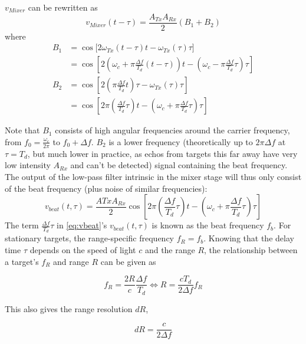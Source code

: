 \(v_{Mixer}\) can be rewritten as 
\begin{equation*}
	v_{Mixer}(t-\tau) = \frac{A_{Tx} A_{Rx}}{2}(B_1 + B_2)
\end{equation*}
where
\begin{align*}
	B_1 &= \cos\bigl[ 2\omega_{Tx}(t-\tau) t - \omega_{Tx}(\tau)\tau \bigr]\\
        &= \cos\left[ 2\left(\omega_c + \pi\frac{\Delta f}{T_d}(t-\tau)\right)t - \left(\omega_c - \pi\frac{\Delta f}{T_d}\tau\right)\tau \right]\\
    B_2 &= \cos\left[ 2\left(\pi\frac{\Delta f}{T_d}t\right)\tau - \omega_{Tx}(\tau)\tau \right]\\
        &= \cos\left[ 2\pi\left(\frac{\Delta f}{T_d}\tau\right)t - \left(\omega_c + \pi\frac{\Delta f}{T_d}\tau\right)\tau \right]
\end{align*}

Note that \(B_1\) consists of high angular frequencies around the
carrier frequency, from \(f_0 = \frac{\omega_c}{2\pi}\) to
\(f_0 + \Delta f\). \(B_2\) is a lower frequency (theoretically up to
\(2\pi\Delta f\) at \(\tau = T_d\), but much lower in practice, as echos
from targets this far away have very low intensity \(A_{Rx}\) and can't
be detected) signal containing the beat frequency. The output of the
low-pass filter intrinsic in the mixer stage will thus only consist of
the beat frequency (plus noise of similar frequencies):
\begin{equation} \label{eq:vbeat}
    v_{beat}(t,\tau) = \frac{A{Tx}A_{Rx}}{2} \cos \left[ 2\pi\left(\frac{\Delta f}{T_d}\tau\right)t - \left(\omega_c + \pi\frac{\Delta f}{T_d}\tau \right) \tau \right]
\end{equation}
The term \(\frac{\Delta f}{T_d}\tau\) in \cref{eq:vbeat}'s \(v_{beat}(t,\tau)\) is
known as the beat frequency \(f_b\). For stationary targets, the
range-specific frequency \(f_R = f_b\). Knowing that the delay time
\(\tau\) depends on the speed of light \(c\) and the range \(R\), the
relationship between a target's \(f_R\) and range \(R\) can be given as

\begin{equation}
	f_R = \frac{2R}{c} \frac{\Delta f}{T_d} \iff R=\frac{c T_d}{2\Delta f}f_R
\end{equation}

This also gives the range resolution \(dR\),

\begin{equation}
	dR = \frac{c}{2 \Delta f}
\end{equation}

